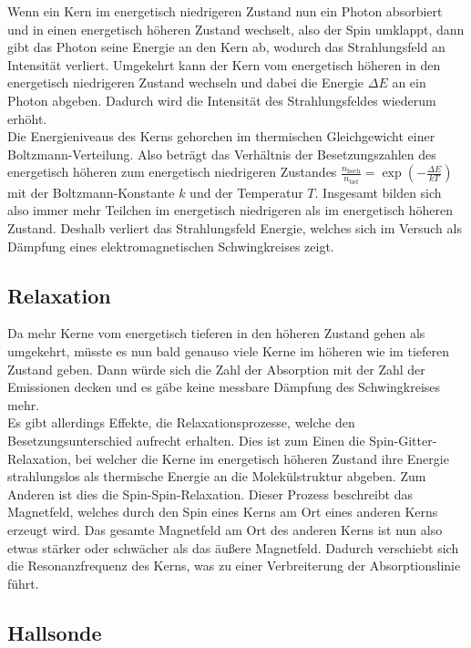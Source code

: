 \documentclass[12pt]{article}
\begin{document}
Wenn ein Kern im energetisch niedrigeren Zustand nun ein Photon absorbiert und in einen energetisch höheren Zustand wechselt, also der Spin umklappt, dann gibt das Photon seine Energie an den Kern ab, wodurch das Strahlungsfeld an Intensität verliert. Umgekehrt kann der Kern vom energetisch höheren in den energetisch niedrigeren Zustand wechseln und dabei die Energie $\Delta E$ an ein Photon abgeben. Dadurch wird die Intensität des Strahlungsfeldes wiederum erhöht.\\

Die Energieniveaus des Kerns gehorchen im thermischen Gleichgewicht einer Boltzmann-Verteilung. Also beträgt das Verhältnis der Besetzungszahlen des energetisch höheren zum energetisch niedrigeren Zustandes $\frac{n_{\text{hoch}}}{n_{\text{tief}}}=\exp\left(-\frac{\Delta E}{kT}\right)$ mit der Boltzmann-Konstante $k$ und der Temperatur $T$. Insgesamt bilden sich also immer mehr Teilchen im energetisch niedrigeren als im energetisch höheren Zustand. Deshalb verliert das Strahlungsfeld Energie, welches sich im Versuch als Dämpfung eines elektromagnetischen Schwingkreises zeigt.

\subsection{Relaxation}
Da mehr Kerne vom energetisch tieferen in den höheren Zustand gehen als umgekehrt, müsste es nun bald genauso viele Kerne im höheren wie im tieferen Zustand geben. Dann würde sich die Zahl der Absorption mit der Zahl der Emissionen decken und es gäbe keine messbare Dämpfung des Schwingkreises mehr.\\

Es gibt allerdings Effekte, die Relaxationsprozesse, welche den Besetzungsunterschied aufrecht erhalten. Dies ist zum Einen die Spin-Gitter-Relaxation, bei welcher die Kerne im energetisch höheren Zustand ihre Energie strahlungslos als thermische Energie an die Molekülstruktur abgeben. Zum Anderen ist dies die Spin-Spin-Relaxation. Dieser Prozess beschreibt das Magnetfeld, welches durch den Spin eines Kerns am Ort eines anderen Kerns erzeugt wird. Das gesamte Magnetfeld am Ort des anderen Kerns ist nun also etwas stärker oder schwächer als das äußere Magnetfeld. Dadurch verschiebt sich die Resonanzfrequenz des Kerns, was zu einer Verbreiterung der Absorptionslinie führt.

\subsection{Hallsonde}
\end{document}
